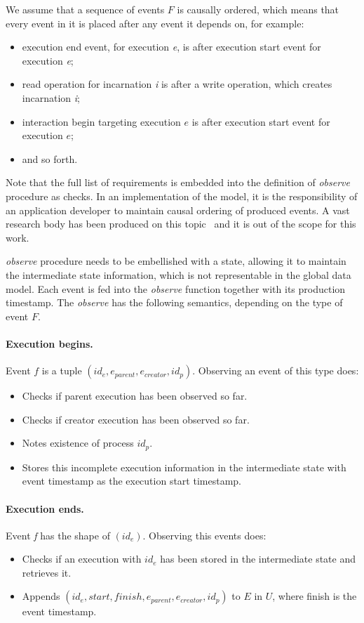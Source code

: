 We assume that a sequence of events $F$ is causally ordered, which means that every event in it is placed after any event it depends on, for example:
%
\begin{itemize}
	\item execution end event, for execution \textit{e}, is after execution start event for execution \textit{e};
	\item read operation for incarnation \textit{i} is after a write operation, which creates incarnation \textit{i};
	\item interaction begin targeting execution $e$ is after execution start event for execution $e$;
	\item and so forth.
\end{itemize}

Note that the full list of requirements is embedded into the definition of \textit{observe} procedure as checks. In an implementation of the model, it is the responsibility of an application developer to maintain causal ordering of produced events. A vast research body has been produced on this topic~\cite{lamport2019time} and it is out of the scope for this work.

\textit{observe} procedure needs to be embellished with a state, allowing it to maintain the intermediate state information, which is not representable in the global data model. Each event is fed into the \textit{observe} function together with its production timestamp. The \textit{observe} has the following semantics, depending on the type of event $F$.

\paragraph*{Execution begins.}
Event $f$ is a tuple $ ( id_{e}, e_{parent}, e_{creator}, id_{p} ) $. Observing an event of this type does:
\begin{itemize}
	\item Checks if parent execution has been observed so far.
	\item Checks if creator execution has been observed so far.
	\item Notes existence of process $id_{p}$.
	\item Stores this incomplete execution information in the intermediate state with event timestamp as the execution start timestamp.
\end{itemize}

\paragraph*{Execution ends.}
Event \textit{f} has the shape of $(id_{e})$. Observing this events does:
\begin{itemize}
	\item Checks if an execution with $id_{e}$ has been stored in the intermediate state and retrieves it.
	\item Appends $(id_{e}, start, finish, e_{parent}, e_{creator}, id_{p})$ to $E$ in $U$, where finish is the event timestamp.
\end{itemize}

